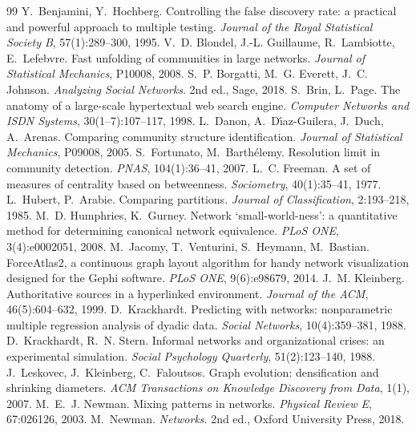 \documentclass[12pt, a4paper]{article}
\begin{document}
\begin{thebibliography}{99}
 Y.~Benjamini, Y.~Hochberg. Controlling the false
  discovery rate: a practical and powerful approach to multiple testing.
  \emph{Journal of the Royal Statistical Society B}, 57(1):289--300, 1995.
 V.~D. Blondel, J.-L. Guillaume, R.~Lambiotte,
  E.~Lefebvre. Fast unfolding of communities in large networks. \emph{Journal
  of Statistical Mechanics}, P10008, 2008.
 S.~P. Borgatti, M.~G. Everett, J.~C. Johnson.
  \emph{Analyzing Social Networks}. 2nd ed., Sage, 2018.
 S.~Brin, L.~Page. The anatomy of a large-scale
  hypertextual web search engine. \emph{Computer Networks and ISDN Systems},
  30(1--7):107--117, 1998.
 L.~Danon, A.~D\'{\i}az-Guilera, J.~Duch, A.~Arenas. Comparing
  community structure identification. \emph{Journal of Statistical Mechanics},
  P09008, 2005.
 S.~Fortunato, M.~Barth\'elemy. Resolution limit in
  community detection. \emph{PNAS}, 104(1):36--41, 2007.
 L.~C. Freeman. A set of measures of centrality based on
  betweenness. \emph{Sociometry}, 40(1):35--41, 1977.
 L.~Hubert, P.~Arabie. Comparing partitions. \emph{Journal
  of Classification}, 2:193--218, 1985.
 M.~D. Humphries, K.~Gurney. Network `small-world-ness':
  a quantitative method for determining canonical network equivalence.
  \emph{PLoS ONE}, 3(4):e0002051, 2008.
 M.~Jacomy, T.~Venturini, S.~Heymann, M.~Bastian.
  ForceAtlas2, a continuous graph layout algorithm for handy network
  visualization designed for the Gephi software. \emph{PLoS ONE},
  9(6):e98679, 2014.
 J.~M. Kleinberg. Authoritative sources in a
  hyperlinked environment. \emph{Journal of the ACM}, 46(5):604--632, 1999.
 D.~Krackhardt. Predicting with networks:
  nonparametric multiple regression analysis of dyadic data. \emph{Social
  Networks}, 10(4):359--381, 1988.
 D.~Krackhardt, R.~N. Stern. Informal networks and
  organizational crises: an experimental simulation. \emph{Social Psychology
  Quarterly}, 51(2):123--140, 1988.
 J.~Leskovec, J.~Kleinberg, C.~Faloutsos. Graph evolution:
  densification and shrinking diameters. \emph{ACM Transactions on Knowledge
  Discovery from Data}, 1(1), 2007.
 M.~E.~J. Newman. Mixing patterns in networks.
  \emph{Physical Review E}, 67:026126, 2003.
 M.~Newman. \emph{Networks}. 2nd ed., Oxford University Press, 2018.

\end{thebibliography}
\end{document}
